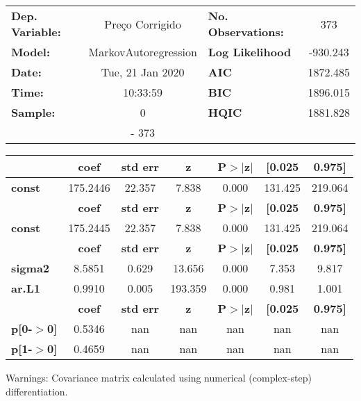 \begin{center}
\begin{tabular}{lclc}
\toprule
\textbf{Dep. Variable:} &   Preço Corrigido    & \textbf{  No. Observations:  } &    373      \\
\textbf{Model:}         & MarkovAutoregression & \textbf{  Log Likelihood     } &  -930.243   \\
\textbf{Date:}          &   Tue, 21 Jan 2020   & \textbf{  AIC                } &  1872.485   \\
\textbf{Time:}          &       10:33:59       & \textbf{  BIC                } &  1896.015   \\
\textbf{Sample:}        &          0           & \textbf{  HQIC               } &  1881.828   \\
\textbf{}               &         - 373        & \textbf{                     } &             \\
\bottomrule
\end{tabular}
\begin{tabular}{lcccccc}
               & \textbf{coef} & \textbf{std err} & \textbf{z} & \textbf{P$>$$|$z$|$} & \textbf{[0.025} & \textbf{0.975]}  \\
\midrule
\textbf{const} &     175.2446  &       22.357     &     7.838  &         0.000        &      131.425    &      219.064     \\
               & \textbf{coef} & \textbf{std err} & \textbf{z} & \textbf{P$>$$|$z$|$} & \textbf{[0.025} & \textbf{0.975]}  \\
\midrule
\textbf{const} &     175.2445  &       22.357     &     7.838  &         0.000        &      131.425    &      219.064     \\
                & \textbf{coef} & \textbf{std err} & \textbf{z} & \textbf{P$>$$|$z$|$} & \textbf{[0.025} & \textbf{0.975]}  \\
\midrule
\textbf{sigma2} &       8.5851  &        0.629     &    13.656  &         0.000        &        7.353    &        9.817     \\
\textbf{ar.L1}  &       0.9910  &        0.005     &   193.359  &         0.000        &        0.981    &        1.001     \\
                   & \textbf{coef} & \textbf{std err} & \textbf{z} & \textbf{P$>$$|$z$|$} & \textbf{[0.025} & \textbf{0.975]}  \\
\midrule
\textbf{p[0-$>$0]} &       0.5346  &          nan     &       nan  &           nan        &          nan    &          nan     \\
\textbf{p[1-$>$0]} &       0.4659  &          nan     &       nan  &           nan        &          nan    &          nan     \\
\bottomrule
\end{tabular}
\end{center}

Warnings: \newline
 [1] Covariance matrix calculated using numerical (complex-step) differentiation.
